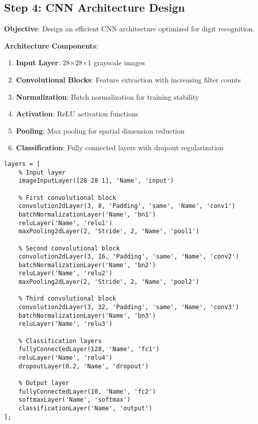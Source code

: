 \documentclass[12pt,a4paper]{article}
\begin{document}
\subsection{Step 4: CNN Architecture Design}

\textbf{Objective}: Design an efficient CNN architecture optimized for digit recognition.

\textbf{Architecture Components}:
\begin{enumerate}
    \item \textbf{Input Layer}: 28×28×1 grayscale images
    \item \textbf{Convolutional Blocks}: Feature extraction with increasing filter counts
    \item \textbf{Normalization}: Batch normalization for training stability
    \item \textbf{Activation}: ReLU activation functions
    \item \textbf{Pooling}: Max pooling for spatial dimension reduction
    \item \textbf{Classification}: Fully connected layers with dropout regularization
\end{enumerate}

\begin{lstlisting}[caption=CNN Architecture Definition]
layers = [
    % Input layer
    imageInputLayer([28 28 1], 'Name', 'input')
    
    % First convolutional block
    convolution2dLayer(3, 8, 'Padding', 'same', 'Name', 'conv1')
    batchNormalizationLayer('Name', 'bn1')
    reluLayer('Name', 'relu1')
    maxPooling2dLayer(2, 'Stride', 2, 'Name', 'pool1')
    
    % Second convolutional block
    convolution2dLayer(3, 16, 'Padding', 'same', 'Name', 'conv2')
    batchNormalizationLayer('Name', 'bn2')
    reluLayer('Name', 'relu2')
    maxPooling2dLayer(2, 'Stride', 2, 'Name', 'pool2')
    
    % Third convolutional block
    convolution2dLayer(3, 32, 'Padding', 'same', 'Name', 'conv3')
    batchNormalizationLayer('Name', 'bn3')
    reluLayer('Name', 'relu3')
    
    % Classification layers
    fullyConnectedLayer(128, 'Name', 'fc1')
    reluLayer('Name', 'relu4')
    dropoutLayer(0.2, 'Name', 'dropout')
    
    % Output layer
    fullyConnectedLayer(10, 'Name', 'fc2')
    softmaxLayer('Name', 'softmax')
    classificationLayer('Name', 'output')
];
\end{lstlisting}
\end{document}
